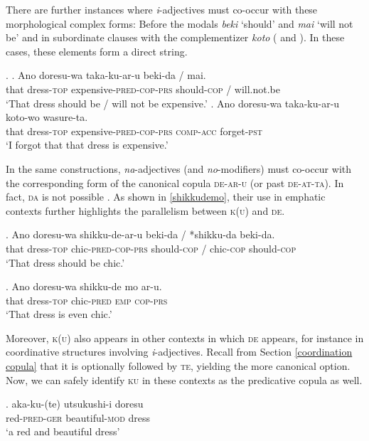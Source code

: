 There are further instances where \textit{i}-adjectives must co-occur with these morphological complex forms: Before the modals \textit{beki} `should’ and \textit{mai} `will not be’ and in subordinate clauses with the complementizer \textit{koto} (\citealt[199]{nishiyama:1999:adj} and \citealt[51]{miyama:2011:da}). In these cases, these elements form a direct string. 

\ex. \ag. Ano doresu-wa taka-ku-ar-u beki-da / mai.\\
that dress-\textsc{top} expensive-\textsc{pred-cop-prs} should-\textsc{cop} / will.not.be\\
`That dress should be / will not be expensive.'
\bg. Ano doresu-wa taka-ku-ar-u koto-wo wasure-ta.\\
that dress-\textsc{top} expensive-\textsc{pred-cop-prs} \textsc{comp}-\textsc{acc} forget-\textsc{pst}\\
`I forgot that that dress is expensive.'

In the same constructions, \textit{na}-adjectives (and \textit{no}-modifiers) must co-occur with the corresponding form of the canonical copula \textsc{de-ar-u}  (or past \textsc{de-at-ta}). In fact, \textsc{da} is not possible \citep[186]{nishiyama:1999:adj}. As shown in \ref{shikkudemo}, their use in emphatic contexts further highlights the parallelism between \textsc{k(u)} and \textsc{de}. 

\exg. Ano doresu-wa shikku-de-ar-u beki-da / *shikku-da beki-da.\\
that dress-\textsc{top} chic-\textsc{pred-cop-prs} should-\textsc{cop} / chic-\textsc{cop} should-\textsc{cop}\\
`That dress should be chic.'

\exg. Ano doresu-wa shikku-de mo ar-u.\\
that dress-\textsc{top} chic-\textsc{pred} \textsc{emp} \textsc{cop-prs}\\
`That dress is even chic.' \label{shikkudemo}

\largerpage
Moreover, \textsc{k(u)} also appears in other contexts in which \textsc{de} appears, for instance in coordinative structures involving \textit{i}-adjectives. Recall from Section \ref{coordination copula} that it is optionally followed by \textsc{te}, yielding the more canonical option. Now, we can safely identify \textsc{ku} in these contexts as the predicative copula as well.  

\exg. aka-ku-(te) utsukushi-i doresu\\
red-\textsc{pred-ger} beautiful-\textsc{mod} dress\\
`a red and beautiful dress'

